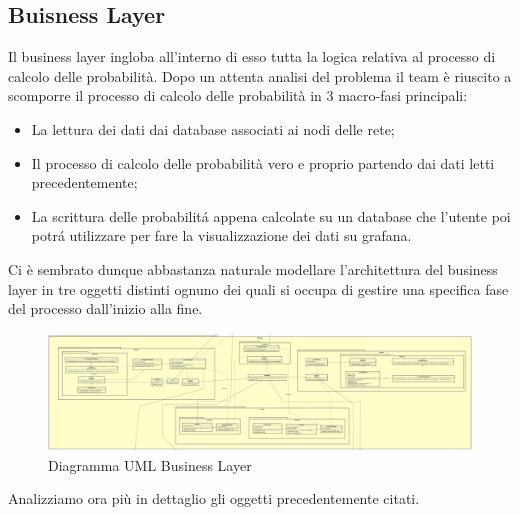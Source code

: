\subsection{Buisness Layer}
Il business layer ingloba all'interno di esso tutta la logica relativa al processo di calcolo delle probabilità.
Dopo un attenta analisi del problema il team è riuscito a scomporre il processo di calcolo delle probabilità in 3 macro-fasi principali:
\begin{itemize}
	\item La lettura dei dati dai database associati ai nodi delle rete;
	\item Il processo di calcolo delle probabilità vero e proprio partendo dai dati letti precedentemente;
	\item La scrittura delle probabilitá appena calcolate su un database che l'utente poi potrá utilizzare per fare la visualizzazione dei dati su grafana.
\end{itemize}
Ci è sembrato dunque abbastanza naturale modellare l'architettura del business layer in tre oggetti distinti ognuno dei quali si occupa di gestire una specifica fase del processo dall'inizio alla fine.
\begin{figure} [H]
	\centering
	\includegraphics[scale=0.1]{Img/BuisnessLayer}
	\caption{Diagramma UML Business Layer}\label{}
\end{figure}
Analizziamo ora più in dettaglio gli oggetti precedentemente citati.
